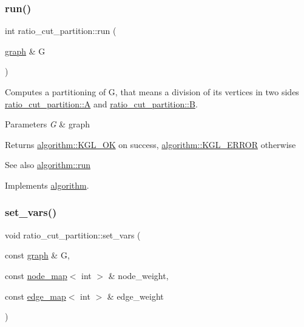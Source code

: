 \subsubsection{\texorpdfstring{run()}{run()}}
{\footnotesize\ttfamily int ratio\+\_\+cut\+\_\+partition\+::run (\begin{DoxyParamCaption}\item[{\mbox{\hyperlink{classgraph}{graph}} \&}]{G }\end{DoxyParamCaption})\hspace{0.3cm}{\ttfamily [virtual]}}

Computes a partitioning of {\ttfamily G}, that means a division of its vertices in two sides {\ttfamily \mbox{\hyperlink{classratio__cut__partition_ae1a3cd1c2ede82023f9a229e40909139}{ratio\+\_\+cut\+\_\+partition\+::A}}} and {\ttfamily \mbox{\hyperlink{classratio__cut__partition_adf075987228d8adc7950d5b1ba332daa}{ratio\+\_\+cut\+\_\+partition\+::B}}}.


\begin{DoxyParams}{Parameters}
{\em G} & graph \\
\hline
\end{DoxyParams}
\begin{DoxyReturn}{Returns}
{\ttfamily \mbox{\hyperlink{classalgorithm_af1a0078e153aa99c24f9bdf0d97f6710aae4c1cd7fe8d8cf4b143241a6e7c31cf}{algorithm\+::\+K\+G\+L\+\_\+\+OK}}} on success, {\ttfamily \mbox{\hyperlink{classalgorithm_af1a0078e153aa99c24f9bdf0d97f6710ae67bf27b2ef31f73e545a7f9f4a69556}{algorithm\+::\+K\+G\+L\+\_\+\+E\+R\+R\+OR}}} otherwise 
\end{DoxyReturn}
\begin{DoxySeeAlso}{See also}
\mbox{\hyperlink{classalgorithm_a734b189509a8d6b56b65f8ff772d43ca}{algorithm\+::run}} 
\end{DoxySeeAlso}


Implements \mbox{\hyperlink{classalgorithm_a734b189509a8d6b56b65f8ff772d43ca}{algorithm}}.

\mbox{\label{classratio__cut__partition_a4c143f82aac5fee3b955414ab7d6ce19}} 
\subsubsection{\texorpdfstring{set\+\_\+vars()}{set\_vars()}\hspace{0.1cm}{\footnotesize\ttfamily [1/5]}}
{\footnotesize\ttfamily void ratio\+\_\+cut\+\_\+partition\+::set\+\_\+vars (\begin{DoxyParamCaption}\item[{const \mbox{\hyperlink{classgraph}{graph}} \&}]{G,  }\item[{const \mbox{\hyperlink{classnode__map}{node\+\_\+map}}$<$ int $>$ \&}]{node\+\_\+weight,  }\item[{const \mbox{\hyperlink{classedge__map}{edge\+\_\+map}}$<$ int $>$ \&}]{edge\+\_\+weight }\end{DoxyParamCaption})}

